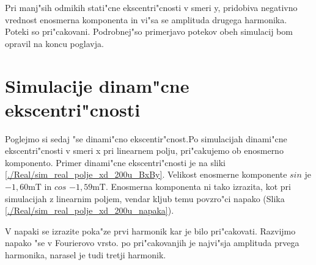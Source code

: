 Pri manj"sih odmikih stati"cne ekscentri"cnosti v smeri y, pridobiva negativno vrednost enosmerna komponenta in vi"sa se amplituda drugega harmonika. Poteki so pri"cakovani. Podrobnej"so primerjavo potekov obeh simulacij bom opravil na koncu poglavja.


%
\section{Simulacije dinam"cne ekscentri"cnosti }
%
Poglejmo si sedaj "se dinami"cno ekscentir"cnost.Po simulacijah dinami"cne ekscentri"cnosti v smeri x pri linearnem polju, pri"cakujemo ob enosmerno komponento. Primer dinami"cne ekscentri"cnosti je na sliki \ref{./Real/sim_real_polje_xd_200u_BxBy}.
Velikost enosmerne komponente $sin$ je $-1,60\mathrm{mT}$ in $cos$ $-1,59\mathrm{mT}$. Enosmerna komponenta ni tako izrazita, kot pri simulacijah z linearnim poljem, vendar kljub temu povzro"ci napako (Slika \ref{./Real/sim_real_polje_xd_200u_napaka}).

V napaki se izrazite poka"ze prvi harmonik kar je bilo pri"cakovati. Razvijmo napako "se v Fourierovo vrsto.
po pri"cakovanjih je najvi"sja amplituda prvega harmonika, narasel je tudi tretji harmonik.

